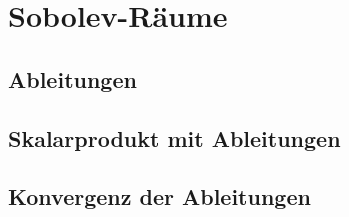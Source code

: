 %
%
%
\section{Sobolev-Räume
\label{buch:skalarprodukt:section:sobolev}}

%
%
\subsection{Ableitungen}

%
%
\subsection{Skalarprodukt mit Ableitungen}

%
%
\subsection{Konvergenz der Ableitungen}





